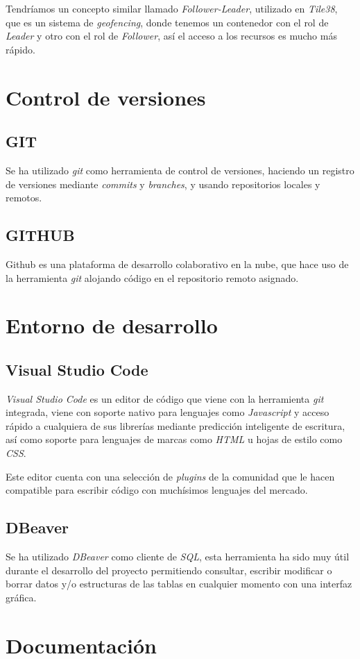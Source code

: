 Tendríamos un concepto similar llamado \textit{Follower-Leader}, utilizado en \textit{Tile38}, que es un sistema de \textit{geofencing}, donde tenemos un contenedor con el rol de \textit{Leader} y otro con el rol de \textit{Follower}, así el acceso a los recursos es mucho más rápido.
\section{Control de versiones}
\subsection{GIT}
Se ha utilizado \textit{git} como herramienta de control de versiones, haciendo un registro de versiones mediante \textit{commits} y \textit{branches}, y usando repositorios locales y remotos.
\subsection{GITHUB}
Github es una plataforma de desarrollo colaborativo en la nube, que hace uso de la herramienta \textit{git} alojando código en el repositorio remoto asignado.
\section{Entorno de desarrollo}
\subsection{Visual Studio Code}
\textit{Visual Studio Code} es un editor de código que viene con la herramienta \textit{git} integrada, viene con soporte nativo para lenguajes como \textit{Javascript} y acceso rápido a cualquiera de sus librerías mediante predicción inteligente de escritura, así como soporte para lenguajes de marcas como \textit{HTML} u hojas de estilo como \textit{CSS}.

Este editor cuenta con una selección de \textit{plugins} de la comunidad que le hacen compatible para escribir código con muchísimos lenguajes del mercado.
\subsection{DBeaver}
Se ha utilizado \textit{DBeaver} como cliente de \textit{SQL}, esta herramienta ha sido muy útil durante el desarrollo del proyecto permitiendo consultar, escribir modificar o borrar datos y/o estructuras de las tablas en cualquier momento con una interfaz gráfica.
\section{Documentación}
